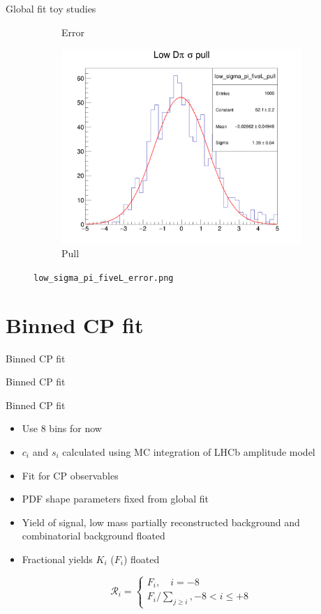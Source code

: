 \documentclass{beamer}
\begin{document}
\begin{frame}{Global fit toy studies}
\begin{figure}
\begin{subfigure}{0.33\textwidth}
      \caption{Error}
    \end{subfigure}%
    \begin{subfigure}{0.33\textwidth}
      \includegraphics[width = 1.0\textwidth]{Plots/low_sigma_pi_fiveL_pull.png}
      \caption{Pull}
    \end{subfigure}
    \caption{\texttt{low\_sigma\_pi\_fiveL\_error.png}}
  \end{figure}
\end{frame}

\section{Binned CP fit}
\begin{frame}{Binned CP fit}
  \begin{center}
    {\huge Binned CP fit}
  \end{center}
\end{frame}

\begin{frame}{Binned CP fit}
  \begin{itemize}
    \setlength\itemsep{1.2em}
    \item{Use $8$ bins for now}
    \item{$c_i$ and $s_i$ calculated using MC integration of LHCb amplitude model}
    \item{Fit for CP observables}
    \item{PDF shape parameters fixed from global fit}
    \item{Yield of signal, low mass partially reconstructed background and combinatorial background floated}
    \item{Fractional yields $K_i$ ($F_i$) floated}
  \end{itemize}
  \begin{equation*}
    \mathcal{R}_i = 
    \begin{cases}
      F_i, \quad i = -8 \\
      F_i/\sum_{j\geq i}, -8 < i\leq+8
    \end{cases}
  \end{equation*}
\end{frame}
\end{document}
